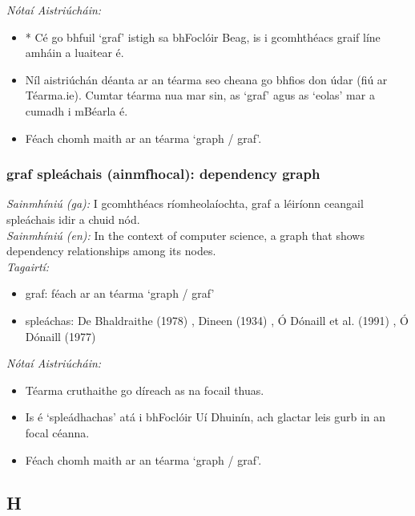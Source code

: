 \documentclass{article}
\begin{document}
 \noindent \textit{Nótaí Aistriúcháin:}
\begin{itemize}
	\item * Cé go bhfuil `graf' istigh sa bhFoclóir Beag, is i gcomhthéacs graif líne amháin a luaitear é.
	\item Níl aistriúchán déanta ar an téarma seo cheana go bhfios don údar (fiú ar Téarma.ie). Cumtar téarma nua mar sin, as `graf' agus as `eolas' mar a cumadh i mBéarla é.
	\item Féach chomh maith ar an téarma `graph / graf'.
\end{itemize}


\subsubsection*{graf spleáchais (ainmfhocal): dependency graph}
 \noindent \textit{Sainmhíniú (ga):} I gcomhthéacs ríomheolaíochta, graf a léiríonn ceangail spleáchais idir a chuid nód.
\\
 \noindent \textit{Sainmhíniú (en):} In the context of computer science, a graph that shows dependency relationships among its nodes.
\\
 \noindent \textit{Tagairtí:}
\begin{itemize}
	\item graf: féach ar an téarma `graph / graf'
	\item spleáchas: De Bhaldraithe (1978) \cite{de-bhaldraithe}, Dineen (1934) \cite{dineen}, Ó Dónaill et al. (1991) \cite{focloir-beag}, Ó Dónaill (1977) \cite{odonaill}
\end{itemize}

 \noindent \textit{Nótaí Aistriúcháin:}
\begin{itemize}
	\item Téarma cruthaithe go díreach as na focail thuas.
	\item Is é `spleádhachas' atá i bhFoclóir Uí Dhuinín, ach glactar leis gurb in an focal céanna.
	\item Féach chomh maith ar an téarma `graph / graf'.
\end{itemize}


\subsection*{H}
\end{document}
